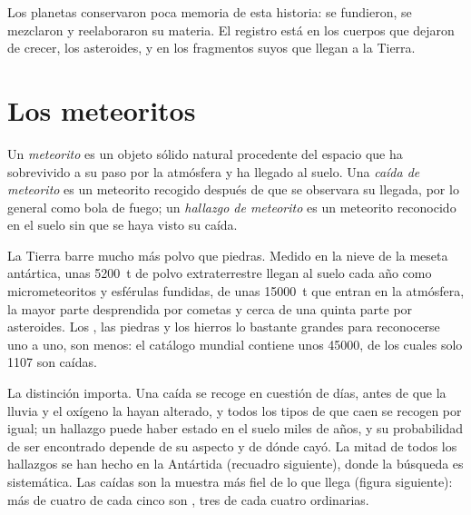 Los planetas conservaron poca memoria de esta historia: se fundieron, se mezclaron y
reelaboraron su materia. El registro está en los cuerpos que dejaron de crecer, los
asteroides, y en los fragmentos suyos que llegan a la Tierra.

\section{Los meteoritos}

\begin{definition}
\label{def:b2:planet-formation-meteorites:fall-find}
Un \emph{meteorito} es un objeto sólido natural procedente del espacio que
ha sobrevivido a su paso por la atmósfera y ha llegado al suelo. Una
\emph{caída de meteorito} es un meteorito recogido después de que se
observara su llegada, por lo general como bola de fuego; un \emph{hallazgo de
meteorito} es un meteorito reconocido en el suelo sin que se haya
visto su caída.
\end{definition}

La Tierra barre mucho más polvo que piedras. Medido en la nieve de la
meseta antártica, unas \qty{5200}{t} de polvo extraterrestre llegan al
suelo cada año como micrometeoritos y esférulas fundidas, de unas
\qty{15000}{t} que entran en la atmósfera, la mayor parte desprendida por cometas y cerca de una
quinta parte por asteroides. Los , las piedras y los hierros lo bastante grandes para
reconocerse uno a uno, son menos: el catálogo mundial contiene unos
\num{45000}, de los cuales solo \num{1107} son caídas.

La distinción importa. Una caída se recoge en cuestión de días, antes de que la lluvia y el
oxígeno la hayan alterado, y todos los tipos de  que caen se recogen
por igual; un hallazgo puede haber estado en el suelo miles de años, y su
probabilidad de ser encontrado depende de su aspecto y de dónde cayó. La mitad de todos
los hallazgos se han hecho en la Antártida (recuadro siguiente), donde la búsqueda es
sistemática. Las caídas son la muestra más fiel de lo que llega (figura siguiente):
más de cuatro de cada cinco son , tres de cada cuatro  ordinarias.

